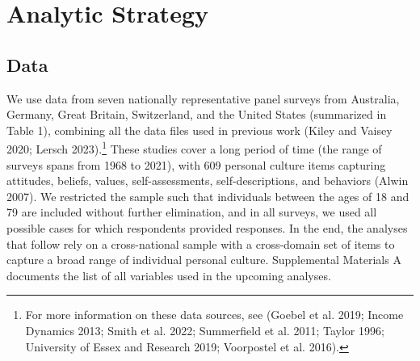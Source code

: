 \documentclass[
  12pt,
]{article}
\begin{document}
\hypertarget{analytic-strategy}{%
\section{Analytic Strategy}\label{analytic-strategy}}

\hypertarget{data}{%
\subsection{Data}\label{data}}

We use data from seven nationally representative panel surveys from
Australia, Germany, Great Britain, Switzerland, and the United States
(summarized in Table 1), combining all the data files used in previous
work (Kiley and Vaisey 2020; Lersch 2023).\footnote{For more information
  on these data sources, see (Goebel et al. 2019; Income Dynamics 2013;
  Smith et al. 2022; Summerfield et al. 2011; Taylor 1996; University of
  Essex and Research 2019; Voorpostel et al. 2016).} These studies cover
a long period of time (the range of surveys spans from 1968 to 2021),
with 609 personal culture items capturing attitudes, beliefs, values,
self-assessments, self-descriptions, and behaviors (Alwin 2007). We
restricted the sample such that individuals between the ages of 18 and
79 are included without further elimination, and in all surveys, we used
all possible cases for which respondents provided responses. In the end,
the analyses that follow rely on a cross-national sample with a
cross-domain set of items to capture a broad range of individual
personal culture. Supplemental Materials A documents the list of all
variables used in the upcoming analyses.

\begin{table}[H]

\caption{\label{tab:unnamed-chunk-1}The Description of the Data Sources}
\centering
{}
\end{table}
\end{document}
